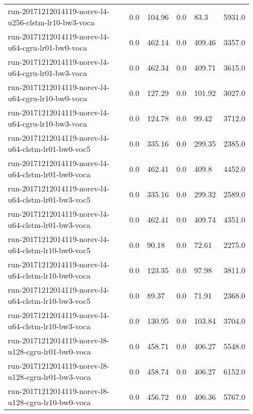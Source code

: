 \begin{landscape}
\begin{longtable}{p{.47\textheight} p{.08\textheight} p{.08\textheight} p{.08\textheight} p{.08\textheight} p{.08\textheight}}
    run-20171212014119-norev-l4-u256-clstm-lr10-bw3-voca & \num{0.0} & \num{104.96} & \num{0.0} & \num{83.3} & \num{5931.0}\\
    run-20171212014119-norev-l4-u64-cgru-lr01-bw0-voca & \num{0.0} & \num{462.14} & \num{0.0} & \num{409.46} & \num{3357.0}\\
    run-20171212014119-norev-l4-u64-cgru-lr01-bw3-voca & \num{0.0} & \num{462.34} & \num{0.0} & \num{409.71} & \num{3615.0}\\
    run-20171212014119-norev-l4-u64-cgru-lr10-bw0-voca & \num{0.0} & \num{127.29} & \num{0.0} & \num{101.92} & \num{3027.0}\\
    run-20171212014119-norev-l4-u64-cgru-lr10-bw3-voca & \num{0.0} & \num{124.78} & \num{0.0} & \num{99.42} & \num{3712.0}\\
    run-20171212014119-norev-l4-u64-clstm-lr01-bw0-voc5 & \num{0.0} & \num{335.16} & \num{0.0} & \num{299.35} & \num{2385.0}\\
    run-20171212014119-norev-l4-u64-clstm-lr01-bw0-voca & \num{0.0} & \num{462.41} & \num{0.0} & \num{409.8} & \num{4452.0}\\
    run-20171212014119-norev-l4-u64-clstm-lr01-bw3-voc5 & \num{0.0} & \num{335.16} & \num{0.0} & \num{299.32} & \num{2589.0}\\
    run-20171212014119-norev-l4-u64-clstm-lr01-bw3-voca & \num{0.0} & \num{462.41} & \num{0.0} & \num{409.74} & \num{4351.0}\\
    run-20171212014119-norev-l4-u64-clstm-lr10-bw0-voc5 & \num{0.0} & \num{90.18} & \num{0.0} & \num{72.61} & \num{2275.0}\\
    run-20171212014119-norev-l4-u64-clstm-lr10-bw0-voca & \num{0.0} & \num{123.35} & \num{0.0} & \num{97.98} & \num{3811.0}\\
    run-20171212014119-norev-l4-u64-clstm-lr10-bw3-voc5 & \num{0.0} & \num{89.37} & \num{0.0} & \num{71.91} & \num{2368.0}\\
    run-20171212014119-norev-l4-u64-clstm-lr10-bw3-voca & \num{0.0} & \num{130.95} & \num{0.0} & \num{103.84} & \num{3704.0}\\
    run-20171212014119-norev-l8-u128-cgru-lr01-bw0-voca & \num{0.0} & \num{458.71} & \num{0.0} & \num{406.27} & \num{5548.0}\\
    run-20171212014119-norev-l8-u128-cgru-lr01-bw3-voca & \num{0.0} & \num{458.74} & \num{0.0} & \num{406.27} & \num{6152.0}\\
    run-20171212014119-norev-l8-u128-cgru-lr10-bw0-voca & \num{0.0} & \num{456.72} & \num{0.0} & \num{406.36} & \num{5767.0}\\

\end{longtable}
\end{landscape}
